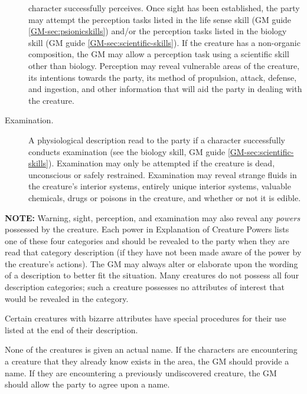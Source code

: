 \begin{description}
  character successfully perceives. Once sight has been established,
  the party may attempt the perception tasks listed in the life sense
  skill (GM guide \ref{GM-sec:psionicskills}) and/or the perception tasks
  listed in the biology skill (GM guide \ref{GM-sec:scientific-skills}). If
  the creature has a non-organic composition, the GM may allow a
  perception task using a scientific skill other than biology.
  Perception may reveal vulnerable areas of the creature, its
  intentions towards the party, its method of propulsion, attack,
  defense, and ingestion, and other information that will aid the
  party in dealing with the creature.
\item[Examination.] A physiological description read to the party if a
  character successfully conducts examination (see the biology skill,
  GM guide \ref{GM-sec:scientific-skills}). Examination may only be attempted
  if the creature is dead, unconscious or safely restrained.
  Examination may reveal strange fluids in the creature's interior
  systems, entirely unique interior systems, valuable chemicals, drugs
  or poisons in the creature, and whether or not it is edible.
\end{description}

\textbf{NOTE:} Warning, sight, perception, and examination may also
reveal any \emph{powers} possessed by the creature. Each power in
Explanation of Creature Powers lists one of these four categories and
should be revealed to the party when they are read that category
description (if they have not been made aware of the power by the
creature's actions). The GM may always alter or elaborate upon the
wording of a description to better fit the situation. Many creatures
do not possess all four description categories; such a creature
possesses no attributes of interest that would be revealed in the
category.

Certain creatures with bizarre attributes have special procedures for
their use listed at the end of their description.

None of the creatures is given an actual name. If the characters are
encountering a creature that they already know exists in the area, the
GM should provide a name. If they are encountering a previously
undiscovered creature, the GM should allow the party to agree upon a
name.

\newenvironment{creature}[1]{%
\refstepcounter{creature}\paragraph{CREATURE Nr. \thecreature:}

#1\\
}{%

\bigskip

}

